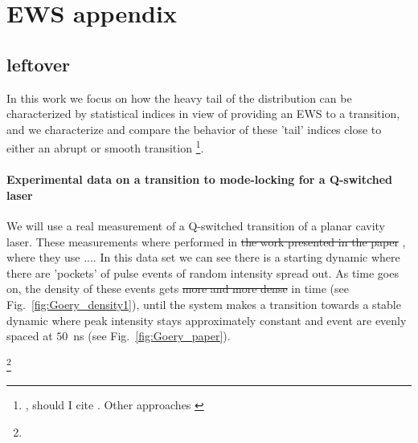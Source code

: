 \chapter{EWS appendix}


\section{leftover}
In this work we focus on how the heavy tail of the distribution can be characterized by statistical indices in view of providing an EWS to a transition, and we characterize and compare the behavior of these 'tail' indices close to either an abrupt or smooth transition \footnote{, should I cite \cite{Noel2017, Notz20590}. Other approaches \cite{fingerprinting,Quax2013}}.


\subsubsection{Experimental data on a transition to mode-locking for a Q-switched laser}
We will use a real measurement of a Q-switched transition of a planar cavity laser. These measurements where performed in \sout{the work presented in the paper} \cite{Ryczkowski2018}, where they use .... 
In this data set we can see there is a starting dynamic where there are 'pockets' of pulse events of random intensity spread out. 
As time goes on, the density of these events gets \sout{more and more dense}  in time (see Fig.~\ref{fig:Goery_density1}), until the system makes a transition towards a stable dynamic where peak intensity stays approximately constant and event are evenly spaced at $50$~ns (see Fig.~\ref{fig:Goery_paper}). 

\footnote{}

